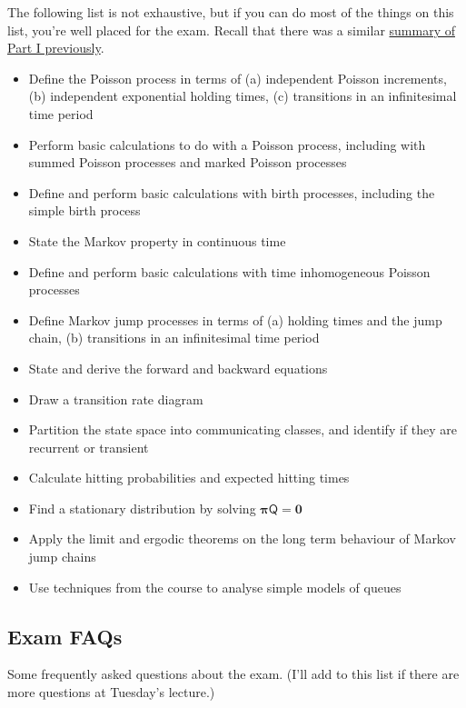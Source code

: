 \documentclass[
  a4paper,
]{article}
\providecommand{\tightlist}{%
  \setlength{\itemsep}{0pt}\setlength{\parskip}{0pt}}
\theoremstyle{definition}
\theoremstyle{definition}
\theoremstyle{definition}
\theoremstyle{remark}
\begin{document}
The following list is not exhaustive, but if you can do most of the things on this list, you're well placed for the exam. Recall that there was a similar \protect\hyperlink{summary-i}{summary of Part I previously}.

\begin{itemize}
\tightlist
\item
  Define the Poisson process in terms of (a) independent Poisson increments, (b) independent exponential holding times, (c) transitions in an infinitesimal time period
\item
  Perform basic calculations to do with a Poisson process, including with summed Poisson processes and marked Poisson processes
\item
  Define and perform basic calculations with birth processes, including the simple birth process
\item
  State the Markov property in continuous time
\item
  Define and perform basic calculations with time inhomogeneous Poisson processes
\item
  Define Markov jump processes in terms of (a) holding times and the jump chain, (b) transitions in an infinitesimal time period
\item
  State and derive the forward and backward equations
\item
  Draw a transition rate diagram
\item
  Partition the state space into communicating classes, and identify if they are recurrent or transient
\item
  Calculate hitting probabilities and expected hitting times
\item
  Find a stationary distribution by solving \(\boldsymbol\pi \mathsf Q = \mathbf 0\)
\item
  Apply the limit and ergodic theorems on the long term behaviour of Markov jump chains
\item
  Use techniques from the course to analyse simple models of queues
\end{itemize}

\hypertarget{exam-faqs}{%
\subsection{Exam FAQs}\label{exam-faqs}}

Some frequently asked questions about the exam. (I'll add to this list if there are more questions at Tuesday's lecture.)
\end{document}

